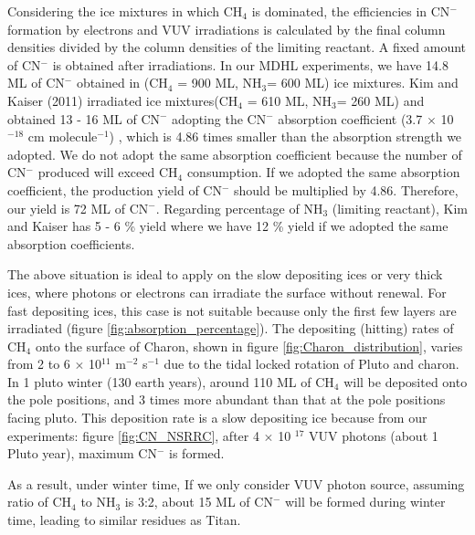 Considering the ice mixtures in which CH$_4$ is dominated, the efficiencies in CN$^-$ formation by electrons and VUV irradiations is calculated by the final column densities divided by the column densities of the limiting reactant. A fixed amount of CN$^-$ is obtained after irradiations. In our MDHL experiments, we have 14.8 ML of CN$^-$ obtained in (CH$_4$ = 900 ML, NH$_3$= 600 ML) ice mixtures. Kim and Kaiser (2011) irradiated  ice mixtures(CH$_4$ = 610 ML, NH$_3$= 260 ML) and obtained 13 - 16 ML of CN$^-$ adopting the CN$^-$ absorption coefficient (3.7 $\times$ 10$^{-18}$ cm molecule$^{-1}$) \cite{georgieva2006computational}, which is 4.86 times smaller than the absorption strength we adopted. We do not adopt the same absorption coefficient because the number of CN$^-$ produced will exceed CH$_4$ consumption. If we adopted the same absorption coefficient, the production yield of CN$^-$ should be multiplied by 4.86. Therefore, our yield is 72 ML of CN$^-$. Regarding percentage of NH$_3$ (limiting reactant), Kim and Kaiser has 5 - 6 \% yield where we have 12 \% yield if we adopted the same absorption coefficients. 

The above situation is ideal to apply on the slow depositing ices or very thick ices, where photons or electrons can irradiate the surface without renewal. For fast depositing ices, this case is not suitable because only the first few layers are irradiated (figure \ref{fig:absorption_percentage}). The depositing (hitting) rates of CH$_4$ onto the surface of Charon, shown in figure \ref{fig:Charon_distribution}, varies from 2 to 6 $\times$ 10$^{11}$ m$^{-2}$ s$^{-1}$ due to the tidal locked rotation of Pluto and charon. In 1 pluto winter (130 earth years), around 110 ML of CH$_4$ will be deposited onto the pole positions, and 3 times more abundant than that at the pole positions facing pluto. This deposition rate is a slow depositing ice because from our experiments: figure \ref{fig:CN_NSRRC}, after 4 $\times$ 10 $^{17}$ VUV photons (about 1 Pluto year), maximum CN$^-$ is formed.

As a result, under winter time, If we only consider VUV photon source, assuming ratio of CH$_4$ to NH$_3$ is 3:2, about 15 ML of CN$^-$ will be formed during winter time, leading to similar residues as Titan.



